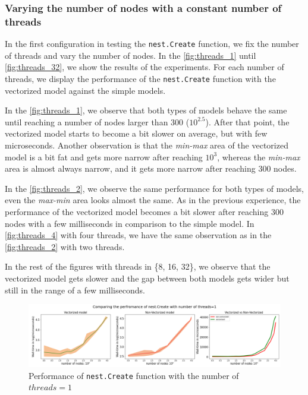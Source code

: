 \subsubsection*{Varying the number of nodes with a constant number of threads}

 In the first configuration in testing the \texttt{nest.Create} function, we fix the number of threads and vary the number of nodes. In the  \autoref{fig:threads_1} until \autoref{fig:threads_32}, we show the results of the experiments. For each number of threads, we display the performance of the \texttt{nest.Create} function with the vectorized model against the simple models. 


In the \autoref{fig:threads_1}, we observe that both types of models behave the same until reaching a number of nodes larger than 300 ($10^{2.5}$). After that point, the vectorized model starts to become a bit slower on average, but with few microseconds. Another observation is that the \emph{min-max} area of the vectorized model is a bit fat and gets more narrow after reaching $10^3$, whereas the \emph{min-max} area is almost always narrow, and it gets more narrow after reaching 300 nodes.

In the \autoref{fig:threads_2}, we observe the same performance for both types of models, even the \emph{max-min} area looks almost the same. As in the previous experience, the performance of the vectorized model becomes a bit slower after reaching 300 nodes with a few milliseconds in comparison to the simple model. In  \autoref{fig:threads_4} with four threads, we have the same observation as in the  \autoref{fig:threads_2} with two threads.

In the rest of the figures with threads in \{8, 16, 32\}, we observe that the vectorized model gets slower and the gap between both models gets wider but still in the range of a few milliseconds.

\begin{figure}[ht!]
    \centering
    \includegraphics[width=\textwidth]{src/pic/thread_1.png}
    \caption{Performance of \texttt{nest.Create} function with the number of $threads=1$}
    \label{fig:threads_1}
\end{figure}

